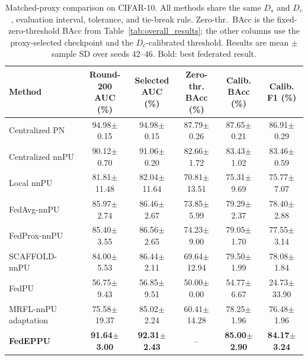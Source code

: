 \documentclass[lettersize,journal]{IEEEtran}
\begin{document}
\begin{table}[!t]
\centering
\caption{Matched-proxy comparison on CIFAR-10. All methods share the same $D_s$ and $D_c$, evaluation interval, tolerance, and tie-break rule. Zero-thr.\ BAcc is the fixed-zero-threshold BAcc from Table~\ref{tab:overall_results}; the other columns use the proxy-selected checkpoint and the $D_c$-calibrated threshold. Results are mean $\pm$ sample SD over seeds 42--46. Bold: best federated result.}
\label{tab:matched_proxy}
\scriptsize
\setlength{\tabcolsep}{5pt}
\begin{tabular}{lccccc}
\toprule
Method
& \makecell{Round-200\\AUC (\%)}
& \makecell{Selected\\AUC (\%)}
& \makecell{Zero-thr.\\BAcc (\%)}
& \makecell{Calib.\\BAcc (\%)}
& \makecell{Calib.\\F1 (\%)} \\
\midrule
Centralized PN & 94.98$\pm$0.15 & 94.98$\pm$0.15 & 87.79$\pm$0.26 & 87.65$\pm$0.21 & 86.91$\pm$0.29 \\
Centralized nnPU & 90.12$\pm$0.70 & 91.06$\pm$0.20 & 82.66$\pm$1.72 & 83.43$\pm$1.02 & 83.46$\pm$0.59 \\
Local nnPU & 81.81$\pm$11.48 & 82.04$\pm$11.64 & 70.81$\pm$13.51 & 75.31$\pm$9.69 & 75.77$\pm$7.07 \\
\midrule
FedAvg-nnPU & 85.97$\pm$2.74 & 86.46$\pm$2.67 & 73.85$\pm$5.99 & 79.29$\pm$2.37 & 78.40$\pm$2.88 \\
FedProx-nnPU & 85.40$\pm$3.55 & 86.56$\pm$2.65 & 74.23$\pm$9.00 & 79.05$\pm$1.70 & 77.55$\pm$3.14 \\
SCAFFOLD-nnPU & 84.00$\pm$5.53 & 86.44$\pm$2.11 & 69.64$\pm$12.94 & 79.50$\pm$1.99 & 78.08$\pm$1.84 \\
FedPU & 56.75$\pm$9.43 & 56.85$\pm$9.51 & 50.00$\pm$0.00 & 54.77$\pm$6.67 & 24.73$\pm$33.90 \\
MRFL-nnPU adaptation & 75.58$\pm$19.37 & 85.02$\pm$2.24 & 60.41$\pm$14.28 & 78.25$\pm$1.96 & 76.48$\pm$1.96 \\
\textbf{FedEPPU} & \textbf{91.64$\pm$3.00} & \textbf{92.31$\pm$2.43} & -- & \textbf{85.00$\pm$2.90} & \textbf{84.17$\pm$3.24} \\
\bottomrule
\end{tabular}
\end{table}
\end{document}
